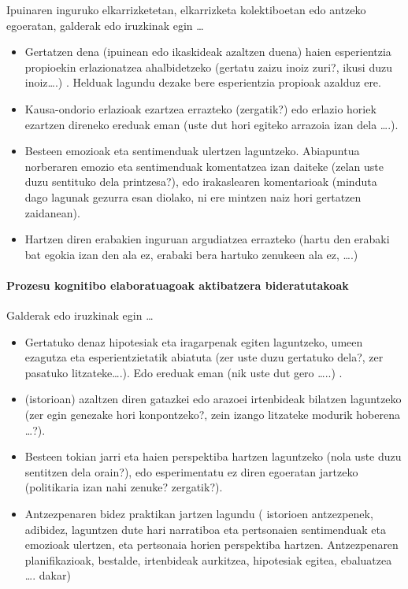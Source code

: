 \documentclass[
]{book}
\providecommand{\tightlist}{%
  \setlength{\itemsep}{0pt}\setlength{\parskip}{0pt}}
\begin{document}
Ipuinaren inguruko elkarrizketetan, elkarrizketa kolektiboetan edo antzeko egoeratan,
galderak edo iruzkinak egin \ldots{}

\begin{itemize}
\tightlist
\item
  Gertatzen dena (ipuinean edo ikaskideak azaltzen duena) haien esperientzia propioekin erlazionatzea ahalbidetzeko (gertatu zaizu inoiz zuri?, ikusi duzu inoiz\ldots.) . Helduak lagundu dezake bere esperientzia propioak azalduz ere.
\item
  Kausa-ondorio erlazioak ezartzea errazteko (zergatik?) edo erlazio horiek ezartzen direneko ereduak eman (uste dut hori egiteko arrazoia izan dela \ldots.).
\item
  Besteen emozioak eta sentimenduak ulertzen laguntzeko. Abiapuntua norberaren emozio eta sentimenduak komentatzea izan daiteke (zelan uste duzu sentituko dela printzesa?), edo irakaslearen komentarioak (minduta dago lagunak gezurra esan diolako, ni ere mintzen naiz hori gertatzen zaidanean).
\item
  Hartzen diren erabakien inguruan argudiatzea errazteko (hartu den erabaki bat egokia izan den ala ez, erabaki bera hartuko zenukeen ala ez, \ldots.)
\end{itemize}

\hypertarget{prozesu-kognitibo-elaboratuagoak-aktibatzera-bideratutakoak}{%
\paragraph{Prozesu kognitibo elaboratuagoak aktibatzera bideratutakoak}\label{prozesu-kognitibo-elaboratuagoak-aktibatzera-bideratutakoak}}

Galderak edo iruzkinak egin \ldots{}

\begin{itemize}
\tightlist
\item
  Gertatuko denaz hipotesiak eta iragarpenak egiten laguntzeko, umeen ezagutza eta esperientzietatik abiatuta (zer uste duzu gertatuko dela?, zer pasatuko litzateke\ldots.). Edo ereduak eman (nik uste dut gero \ldots..) .
\item
  (istorioan) azaltzen diren gatazkei edo arazoei irtenbideak bilatzen laguntzeko (zer egin genezake hori konpontzeko?, zein izango litzateke modurik hoberena \ldots?).
\item
  Besteen tokian jarri eta haien perspektiba hartzen laguntzeko (nola uste duzu sentitzen dela orain?), edo esperimentatu ez diren egoeratan jartzeko (politikaria izan nahi zenuke? zergatik?).
\item
  Antzezpenaren bidez praktikan jartzen lagundu ( istorioen antzezpenek, adibidez, laguntzen dute hari narratiboa eta pertsonaien sentimenduak eta emozioak ulertzen, eta pertsonaia horien perspektiba hartzen. Antzezpenaren planifikazioak, bestalde, irtenbideak aurkitzea, hipotesiak egitea, ebaluatzea \ldots. dakar)
\end{itemize}
\end{document}
